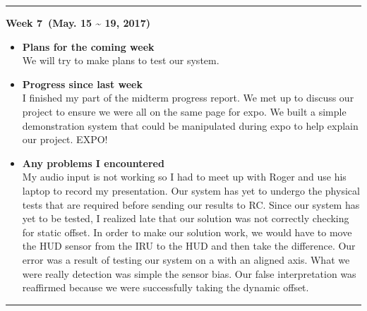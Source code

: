 	\rule{\textwidth}{0.5pt}

	\begin{center}
		\textbf{Week 7 (May. 15 {\textasciitilde{}} 19, 2017)}
	\end{center}
	\begin{itemize}
		\item \textbf{Plans for the coming week}
		\\We will try to make plans to test our system.\\

		\item \textbf{Progress since last week}
		\\I finished my part of the midterm progress report. We met up to discuss our project to ensure we were all on the same page for expo. We built a simple demonstration system that could be manipulated during expo to help explain our project. EXPO!\\

		\item \textbf{Any problems I encountered}
		\\My audio input is not working so I had to meet up with Roger and use his laptop to record my presentation. Our system has yet to undergo the physical tests that are required before sending our results to RC. Since our system has yet to be tested, I realized late that our solution was not correctly checking for static offset. In order to make our solution work, we would have to move the HUD sensor from the IRU to the HUD and then take the difference. Our error was a result of testing our system on a with an aligned axis. What we were really detection was simple the sensor bias. Our false interpretation was reaffirmed because we were successfully taking the dynamic offset.\\
	\end{itemize}

	\rule{\textwidth}{0.5pt}

